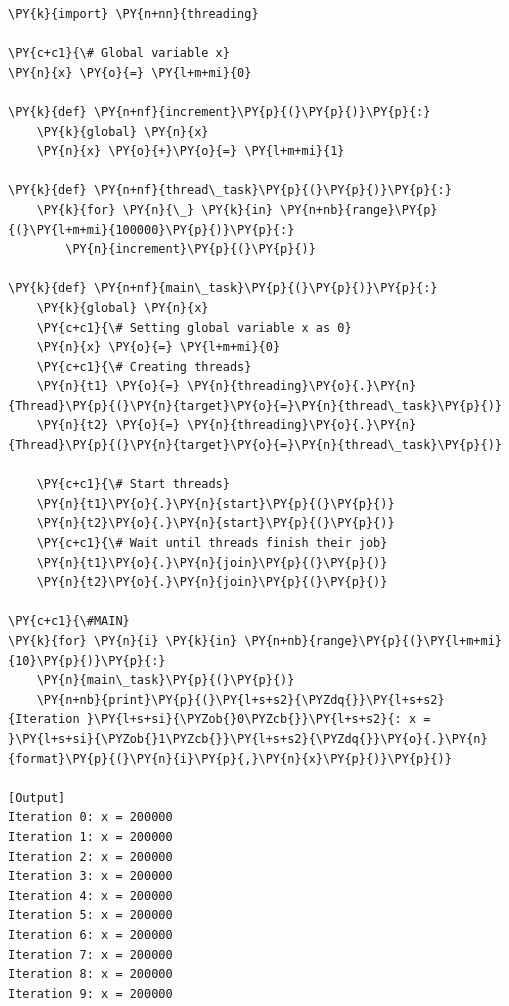 \begin{Verbatim}[label=\makebox{\url{https://github.com/lucabaldini/cmepda/tree/master/slides/latex/snippets/threading_race_condition.py}},commandchars=\\\{\}]
\PY{k}{import} \PY{n+nn}{threading}

\PY{c+c1}{\# Global variable x}
\PY{n}{x} \PY{o}{=} \PY{l+m+mi}{0}

\PY{k}{def} \PY{n+nf}{increment}\PY{p}{(}\PY{p}{)}\PY{p}{:}
    \PY{k}{global} \PY{n}{x}
    \PY{n}{x} \PY{o}{+}\PY{o}{=} \PY{l+m+mi}{1}

\PY{k}{def} \PY{n+nf}{thread\_task}\PY{p}{(}\PY{p}{)}\PY{p}{:}
    \PY{k}{for} \PY{n}{\_} \PY{k}{in} \PY{n+nb}{range}\PY{p}{(}\PY{l+m+mi}{100000}\PY{p}{)}\PY{p}{:}
        \PY{n}{increment}\PY{p}{(}\PY{p}{)}

\PY{k}{def} \PY{n+nf}{main\_task}\PY{p}{(}\PY{p}{)}\PY{p}{:}
    \PY{k}{global} \PY{n}{x}
    \PY{c+c1}{\# Setting global variable x as 0}
    \PY{n}{x} \PY{o}{=} \PY{l+m+mi}{0}
    \PY{c+c1}{\# Creating threads}
    \PY{n}{t1} \PY{o}{=} \PY{n}{threading}\PY{o}{.}\PY{n}{Thread}\PY{p}{(}\PY{n}{target}\PY{o}{=}\PY{n}{thread\_task}\PY{p}{)}
    \PY{n}{t2} \PY{o}{=} \PY{n}{threading}\PY{o}{.}\PY{n}{Thread}\PY{p}{(}\PY{n}{target}\PY{o}{=}\PY{n}{thread\_task}\PY{p}{)}

    \PY{c+c1}{\# Start threads}
    \PY{n}{t1}\PY{o}{.}\PY{n}{start}\PY{p}{(}\PY{p}{)}
    \PY{n}{t2}\PY{o}{.}\PY{n}{start}\PY{p}{(}\PY{p}{)}
    \PY{c+c1}{\# Wait until threads finish their job}
    \PY{n}{t1}\PY{o}{.}\PY{n}{join}\PY{p}{(}\PY{p}{)}
    \PY{n}{t2}\PY{o}{.}\PY{n}{join}\PY{p}{(}\PY{p}{)}

\PY{c+c1}{\#MAIN}
\PY{k}{for} \PY{n}{i} \PY{k}{in} \PY{n+nb}{range}\PY{p}{(}\PY{l+m+mi}{10}\PY{p}{)}\PY{p}{:}
    \PY{n}{main\_task}\PY{p}{(}\PY{p}{)}
    \PY{n+nb}{print}\PY{p}{(}\PY{l+s+s2}{\PYZdq{}}\PY{l+s+s2}{Iteration }\PY{l+s+si}{\PYZob{}0\PYZcb{}}\PY{l+s+s2}{: x = }\PY{l+s+si}{\PYZob{}1\PYZcb{}}\PY{l+s+s2}{\PYZdq{}}\PY{o}{.}\PY{n}{format}\PY{p}{(}\PY{n}{i}\PY{p}{,}\PY{n}{x}\PY{p}{)}\PY{p}{)}

[Output]
Iteration 0: x = 200000
Iteration 1: x = 200000
Iteration 2: x = 200000
Iteration 3: x = 200000
Iteration 4: x = 200000
Iteration 5: x = 200000
Iteration 6: x = 200000
Iteration 7: x = 200000
Iteration 8: x = 200000
Iteration 9: x = 200000
\end{Verbatim}